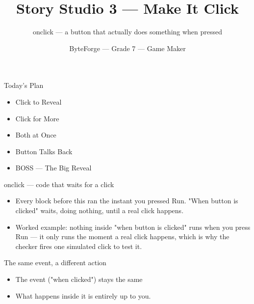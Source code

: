 \documentclass[aspectratio=169]{beamer}
\title{Story Studio 3 — Make It Click}
\subtitle{onclick — a button that actually does something when pressed}
\author{ByteForge --- Grade 7 --- Game Maker}
\date{}
\begin{document}
\begin{frame}
    \titlepage
\end{frame}

\begin{frame}{Today's Plan}
    \begin{itemize}
        \item Click to Reveal
        \item Click for More
        \item Both at Once
        \item Button Talks Back
        \item[$\bigstar$] BOSS --- The Big Reveal
    \end{itemize}
\end{frame}

\begin{frame}{onclick — code that waits for a click}
    \large
    \begin{itemize}
        \item Every block before this ran the instant you pressed Run. "When button is clicked" waits, doing nothing, until a real click happens.
        \item Worked example: nothing inside "when button is clicked" runs when you press Run — it only runs the moment a real click happens, which is why the checker fires one simulated click to test it.
    \end{itemize}

    \begin{center}
    \end{center}
\end{frame}


\begin{frame}{The same event, a different action}
    \large
    \begin{itemize}
        \item The event ("when clicked") stays the same
        \item What happens inside it is entirely up to you.
    \end{itemize}
\end{frame}
\end{document}
